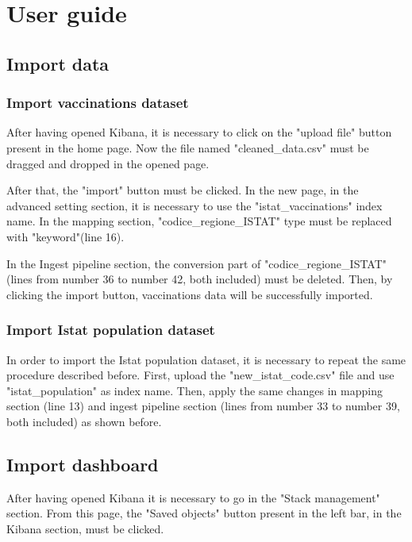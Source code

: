 \documentclass{article}
\begin{document}
\newpage

\section{User guide}

\subsection{Import data}
\subsubsection{Import vaccinations dataset}
After having opened Kibana, it is necessary to click on the {\selectfont"upload file"} button present in the home page. Now the file named {\selectfont"cleaned\_data.csv"} must be dragged and dropped in the opened page.

After that, the {\selectfont"import"} button must be clicked. In the new page, in the advanced setting section, it is necessary to use the {\selectfont"istat\_vaccinations"} index name. In the mapping section, {\selectfont"codice\_regione\_ISTAT"} type must be replaced with "keyword"(line 16).

In the Ingest pipeline section, the conversion part of {\selectfont"codice\_regione\_ISTAT"} (lines from number 36 to number 42, both included) must be deleted.
Then, by clicking the import button, vaccinations data will be successfully imported.

\subsubsection{Import Istat population dataset}
In order to import the Istat population dataset, it is necessary to repeat the same procedure described before. First, upload the {\selectfont"new\_istat\_code.csv"} file and use {\selectfont"istat\_population"} as index name. Then, apply the same changes in mapping section (line 13) and ingest pipeline section (lines from number 33 to number 39, both included) as shown before.


\subsection{Import dashboard}
After having opened Kibana it is necessary to go in the {\selectfont"Stack management"} section. From this page, the {\selectfont"Saved objects"} button present in the left bar, in the Kibana section, must be clicked.
\end{document}
